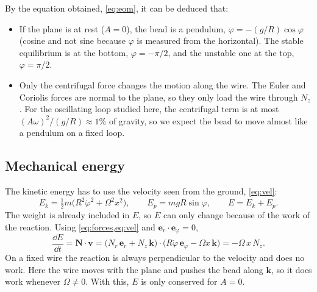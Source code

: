 \documentclass[11pt,a4paper]{article}
\newcommand{\dt}[1]{\dot{#1}}
\newcommand{\ddt}[1]{\ddot{#1}}
\newcommand{\er}{\bm{e}_r}
\newcommand{\ephi}{\bm{e}_\varphi}
\newcommand{\kk}{\bm{k}}
\begin{document}
By the equation obtained, \cref{eq:eom}, it can be deduced that:
\begin{itemize}[noitemsep,topsep=2pt]
\item If the plane is at rest ($A=0$), the bead is a pendulum, $\ddt\varphi=-(g/R)\cos\varphi$ (cosine and not sine because $\varphi$ is measured from the horizontal). The stable equilibrium is at the bottom, $\varphi=-\pi/2$, and the unstable one at the top, $\varphi=\pi/2$.
\item Only the centrifugal force changes the motion along the wire. The Euler and Coriolis forces are normal to the plane, so they only load the wire through $N_z$. For the oscillating loop studied here, the centrifugal term is at most $(A\omega)^2/(g/R)\approx1\%$ of gravity, so we expect the bead to move almost like a pendulum on a fixed loop.

\end{itemize}

\subsection{Mechanical energy}
The kinetic energy has to use the velocity seen from the ground, \cref{eq:vel}:
\begin{equation}
E_k=\tfrac12m\big(R^2\dt\varphi^2+\Omega^2x^2\big),\qquad E_p=mgR\sin\varphi,\qquad E=E_k+E_p .
\label{eq:E}
\end{equation}
The weight is already included in $E$, so $E$ can only change because of the work of the reaction. Using \cref{eq:forces,eq:vel} and $\er\cdot\ephi=0$,
\begin{equation}
\frac{\dd E}{\dd t}=\bm N\cdot\bm v=\big(N_r\,\er+N_z\,\kk\big)\cdot\big(R\dt\varphi\,\ephi-\Omega x\,\kk\big)=-\Omega\,x\,N_z .
\label{eq:Edot}
\end{equation}
On a fixed wire the reaction is always perpendicular to the velocity and does no work. Here the wire moves with the plane and pushes the bead along $\kk$, so it does work whenever $\Omega\neq0$. With this, $E$ is only conserved for $A=0$.
\end{document}
